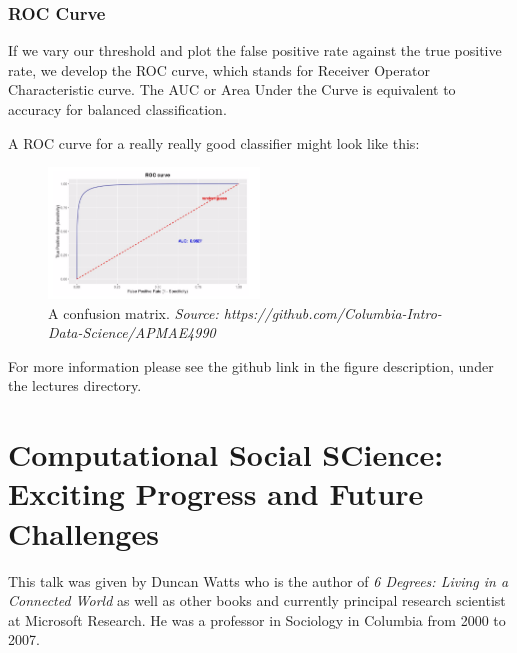 \pagebreak

\subsubsection{ROC Curve}
If we vary our threshold and plot the false positive rate against the true positive rate, we develop the ROC curve, which stands for Receiver Operator Characteristic curve.  The AUC or Area Under the Curve is equivalent to accuracy for balanced classification.  

A ROC curve for a really really good classifier might look like this:  

\begin{figure}[ht]
  \begin{center}
    \includegraphics[width=0.5\textwidth]{figures/ROC_curve.png}
    \caption{
      A confusion matrix. \textit{Source: https://github.com/Columbia-Intro-Data-Science/APMAE4990} 
      }
    \label{Figure 3}
  \end{center}
\end{figure}

For more information please see the github link in the figure description, under the lectures directory.  


\section{Computational Social SCience: Exciting Progress and Future Challenges}
This talk was given by Duncan Watts who is the author of \textit{6 Degrees: Living in a Connected World} as well as other books and currently principal research scientist at Microsoft Research.  He was a professor in Sociology in Columbia from 2000 to 2007.  

